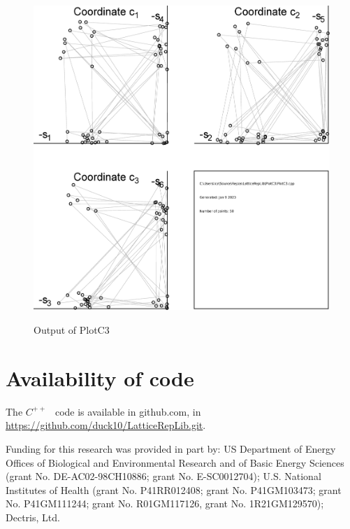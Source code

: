 \documentclass[preprint]{iucr}              %
\numberwithin{equation}{section}
\begin{document}
		
	\begin{figure}
		\includegraphics[width=\textwidth]{PlotC3}
		\label{plotc3}
		\caption{Output of PlotC3}
	\end{figure}
	
	\section{Availability of code}
	
	The $C^{++}$ ~code is available in github.com, in
	\url{https://github.com/duck10/LatticeRepLib.git}.
	
	
	
	
	
	Funding for this research was provided in part by:  
	US Department of Energy Offices of Biological and 
	Environmental Research and of Basic Energy Sciences 
	(grant No. DE-AC02-98CH10886; grant No. E-SC0012704); 
	U.S. National Institutes of Health (grant No. P41RR012408; 
	grant No. P41GM103473; grant No. P41GM111244; 
	grant No. R01GM117126,
	grant No. 1R21GM129570); Dectris, Ltd.
	
	
		
		
		
	
	
	
	
	
	
	
	
\end{document}
